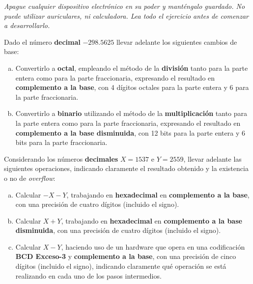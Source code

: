 \documentclass[12pt,a4paper]{article}
\begin{document}

\begin{centering}
\emph{Apague cualquier dispositivo electrónico en su poder y manténgalo guardado. No puede utilizar auriculares, ni calculadora. Lea todo el ejercicio antes de comenzar a desarrollarlo.}	
\end{centering}

Dado el número \textbf{decimal} $-298.5625$ llevar adelante los siguientes cambios de base:
\begin{enumerate}[a)]
	\item Convertirlo a \textbf{octal}, empleando el método de la \textbf{división} tanto para la parte entera como para la parte fraccionaria, expresando el resultado en \textbf{complemento a la base}, con 4 dígitos octales para la parte entera y 6 para la parte fraccionaria.

	\item Convertirlo a \textbf{binario} utilizando el método de la \textbf{multiplicación} tanto para la parte entera como para la parte fraccionaria, expresando el resultado en \textbf{complemento a la base disminuida}, con 12 bits para la parte entera y 6 bits para la parte fraccionaria.
\end{enumerate}

Considerando los números {\textbf{decimales}} $X = 1537$ e $Y = 2559$, llevar adelante las siguientes operaciones, indicando claramente el resultado obtenido y la existencia o no de \emph{overflow}:
\begin{enumerate}[a)]
	\item Calcular $- X - Y$, trabajando en \textbf{hexadecimal} en \textbf{complemento a la base}, con una precisión de cuatro dígitos (incluido el signo).
	\item Calcular $ X + Y $, trabajando en \textbf{hexadecimal} en \textbf{complemento a la base disminuida}, con una precisión de cuatro dígitos (incluido el signo).
	\item Calcular $X - Y$, haciendo uso de un hardware que opera en una codificación \textbf{BCD Exceso-3} y \textbf{complemento a la base}, con una precisión de cinco dígitos (incluido el signo), indicando claramente qué operación se está realizando en cada uno de los pasos intermedios.
\end{enumerate}
\end{document}
